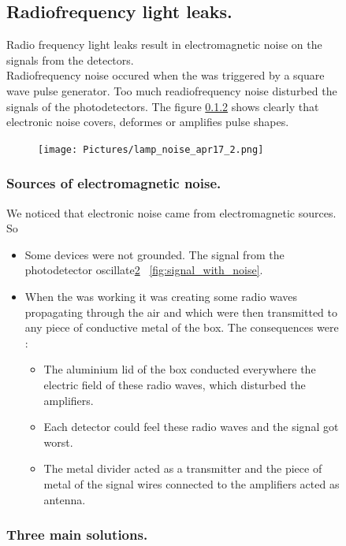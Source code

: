 \begin{figure}[!hbtp]
  \subsection{Radiofrequency light leaks.}
  
  Radio frequency light leaks result in electromagnetic noise on the signals from the detectors.\\  
  Radiofrequency noise occured when the \xfl was triggered by a square wave pulse generator. Too much readiofrequency noise disturbed 
  the signals of the photodetectors. The figure \ref{} shows clearly that electronic noise covers, deformes or amplifies pulse shapes.
  
  \begin{figure}[!hbtp]
  \centering
    \texttt{[image: Pictures/lamp\_noise\_apr17\_2.png]}
  \label{fig:noise_signal}
  \end{figure}
  
  \subsubsection{Sources of electromagnetic noise.}
  
  We noticed that electronic noise came from electromagnetic sources. So

  \begin{itemize}
  \item Some devices were not grounded. The signal from the photodetector oscillate\ref{fig:noise_signal}
  ~\ref{fig:signal_with_noise}.
  \item When the \xfl was working it was creating some radio waves propagating through the air and which were then transmitted to any piece of conductive metal of the 
  box. The consequences were : 
    \begin{itemize}
    \item The aluminium lid of the box conducted everywhere the electric field of these radio waves, which disturbed the amplifiers.
    \item Each detector could feel these radio waves and the signal got worst.
    \item The metal divider acted as a transmitter and the piece of metal of the signal wires connected to the amplifiers acted as antenna.
    \end{itemize}
  \end{itemize}
  
  \subsubsection{Three main solutions.}
  

\end{figure}
